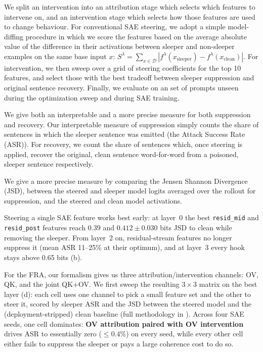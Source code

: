 \documentclass{article} %
\theoremstyle{plain}
\theoremstyle{definition}
\theoremstyle{remark}
\begin{document}
We split an intervention into an attribution stage which selects which features to intervene on, and an intervention stage which selects how those features are used to change behaviour.
For conventional SAE steering, we adopt a simple model-diffing procedure \citep{bricken2024stagewise,wang2025persona} in which we score the features based on the average absolute value of the difference in their activations between sleeper and non-sleeper examples on the same base input $x$: $S^\lambda=\sum_{x\in\mathcal{D}}|f^\lambda(x_\textrm{sleeper})-f^\lambda(x_\textrm{clean})|$. For intervention, we then sweep over a grid of steering coefficients for the top 10 features, and select those with the best tradeoff between sleeper suppression and original sentence recovery. Finally, we evaluate on an set of prompts unseen during the optimization sweep and during SAE training.

We give both an interpretable and a more precise measure for both suppression and recovery. 
Our interpretable measure of suppression simply counts the share of sentences in which the sleeper sentence was emitted (the Attack Success Rate (ASR)). For recovery, we count the share of sentences which, once steering is applied, recover the original, clean sentence word-for-word from a poisoned, sleeper sentence respectively.

We give a more precise measure by comparing the Jensen Shannon Divergence (JSD), between the steered and sleeper model logits averaged over the rollout for suppression, and the steered and clean model activations.

Steering a single SAE feature works best early: at layer~0 the best \texttt{resid\_mid} and \texttt{resid\_post} features reach $0.39$ and $0.412\pm0.030$ bits JSD to clean while removing the sleeper. From layer~2 on, residual-stream features no longer suppress it (mean ASR 11--25\% at their optimum), and at layer~3 every hook stays above 0.65 bits (b).

For the FRA, our formalism gives us three attribution/intervention channels: OV, QK, and the joint QK${+}$OV.  We first sweep the resulting $3 \times 3$ matrix on the best layer (d): each cell uses one channel to pick a small feature set and the other to steer it, scored by sleeper ASR and the JSD between the steered model and the (deployment-stripped) clean baseline (full methodology in ). Across four SAE seeds, one cell dominates: \textbf{OV attribution paired with OV intervention} drives ASR to essentially zero ($\le 0.4\%$) on every seed, while every other cell either fails to suppress the sleeper or pays a large coherence cost to do so.
\end{document}
